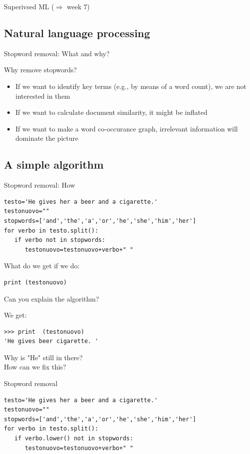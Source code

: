 \documentclass{beamer}
\begin{document}
\begin{frame}{Superivsed ML ($\Rightarrow$ week 7)}
\subsection{Natural language processing}
\begin{frame}{Stopword removal: What and why?}
\begin{block}{Why remove stopwords?}
\begin{itemize}
\item If we want to identify key terms (e.g., by means of a word count), we are not interested in them
\item If we want to calculate document similarity, it might be inflated
\item If we want to make a word co-occurance graph, irrelevant information will dominate the picture
\end{itemize}
\end{block}
\end{frame}

\subsection{A simple algorithm}
\begin{frame}[fragile]{Stopword removal: How}
\begin{lstlisting}
testo='He gives her a beer and a cigarette.'
testonuovo=""
stopwords=['and','the','a','or','he','she','him','her']
for verbo in testo.split():
   if verbo not in stopwords:
      testonuovo=testonuovo+verbo+" "
\end{lstlisting}
What do we get if we do:
\begin{lstlisting}
print (testonuovo)
\end{lstlisting}
Can you explain the algorithm?
\end{frame}

\begin{frame}[fragile]{We get:}
\begin{lstlisting}
>>> print  (testonuovo)
'He gives beer cigarette. '
\end{lstlisting}
Why is "He" still in there? \\ How can we fix this?
\end{frame}

\begin{frame}[fragile]{Stopword removal}
\begin{lstlisting}
testo='He gives her a beer and a cigarette.'
testonuovo=""
stopwords=['and','the','a','or','he','she','him','her']
for verbo in testo.split():
   if verbo.lower() not in stopwords:
      testonuovo=testonuovo+verbo+" "
\end{lstlisting}
\end{frame}






\end{frame}
\end{document}
